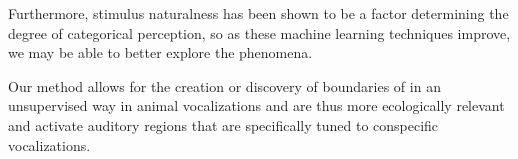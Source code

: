 Furthermore, stimulus naturalness has been shown to be a factor determining the degree of categorical perception\cite{van1999categorical}, so as these machine learning techniques improve, we may be able to better explore the \CP phenomena.

Our method allows for the creation or discovery of boundaries of \CP in an unsupervised way in animal vocalizations and are thus more ecologically relevant and activate auditory regions that are specifically tuned to conspecific vocalizations.